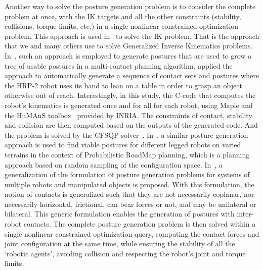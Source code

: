 Another way to solve the posture generation problem is to consider the complete problem at once, with the IK targets and all the other constraints (stability, collisions, torque limits, etc.) in a single nonlinear constrained optimization problem.
This approach is used in~\cite{Zhao1994} to solve the IK problem.
That is the approach that we and many others use to solve Generalized Inverse Kinematics problems.
In~\cite{escande:iros:2006}, such an approach is employed to generate postures that are used to grow a tree of usable postures in a multi-contact planning algorithm.
\cite{escande:iros:2006} applied the approach to automatically generate a sequence of contact sets and postures where the HRP-2 robot uses its hand to lean on a table in order to grasp an object otherwise out of reach.
Interestingly, in this study, the C-code that computes the robot's kinematics is generated once and for all for each robot, using Maple and the HuMAnS toolbox~\cite{wieber2006humans} provided by INRIA.
The constraints of contact, stability and collision are then computed based on the outputs of the generated code.
And the problem is solved by the CFSQP solver~\cite{cfsqp:manual}.
In~\cite{hauser:ijrr:2008}, a similar posture generation approach is used to find viable postures for different legged robots on varied terrains in the context of Probabilistic RoadMap planning, which is a planning approach based on random sampling of the configuration space.
In~\cite{bouyarmane2010static}, a generalization of the formulation of posture generation problems for systems of multiple robots and manipulated objects is proposed.
With this formulation, the notion of contacts is generalized such that they are not necessarily coplanar, nor necessarily horizontal, frictional, can bear forces or not, and may be unilateral or bilateral.
This generic formulation enables the generation of postures with inter-robot contacts.
The complete posture generation problem is then solved within a single nonlinear constrained optimization query, computing the contact forces and joint configuration at the same time, while ensuring the stability of all the `robotic agents', avoiding collision and respecting the robot's joint and torque limits.

